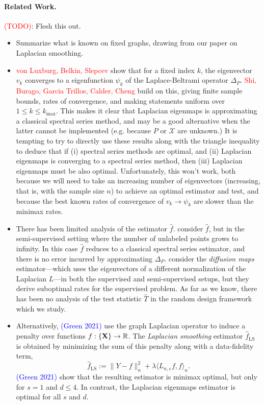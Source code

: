 \documentclass{article}
\newcommand{\Reals}{\mathbb{R}}
\newcommand{\1}{\mathbf{1}}
\newcommand{\mc}[1]{\mathcal{#1}}
\newcommand{\dotp}[2]{\langle #1, #2 \rangle}
\newcommand{\wh}[1]{\widehat{#1}}
\theoremstyle{alden}
\theoremstyle{aldenthm}
\theoremstyle{definition}
\theoremstyle{remark}
\begin{document}
\paragraph{Related Work.}
\textcolor{red}{(TODO)}: Flesh this out.
\begin{itemize}
	\item Summarize what is known on fixed graphs, drawing from our paper on Laplacian smoothing.
	\item \textcolor{red}{von Luxburg, Belkin, Slepcev} show that for a fixed index $k$, the eigenvector $v_k$ converges to a eigenfunction $\psi_k$ of the Laplace-Beltrami operator $\Delta_P$. \textcolor{red}{Shi, Burago, Garcia Trillos, Calder, Cheng} build on this, giving finite sample bounds, rates of convergence, and making statements uniform over $1 \leq k \leq k_{\max}$. This makes it clear that Laplacian eigenmaps is approximating a classical spectral series method, and may be a good alternative when the latter cannot be implemented (e.g. because $P$ or $\mc{X}$ are unknown.) It is tempting to try to directly use these results along with the triangle inequality to deduce that if (i)  spectral series methods are optimal, and (ii) Laplacian eigenmaps is converging to a spectral series method, then (iii) Laplacian eigenmaps must be also optimal. Unfortunately, this won't work, both because we will need to take an increasing number of eigenvectors (increasing, that is, with the sample size $n$) to achieve an optimal estimator and test, and because the best known rates of convergence of $v_k \to \psi_k$ are slower than the minimax rates.
	\item There has been limited analysis of the estimator $\wh{f}$. \cite{zhou2011} consider $\wh{f}$, but in the semi-supervised setting where the number of unlabeled points grows to infinity. In this case $\wh{f}$ reduces to a classical spectral series estimator, and there is no error incurred by approximating $\Delta_P$. \cite{lee2016} consider the \emph{diffusion maps} estimator---which uses the eigenvectors of a different normalization of the Laplacian $L$---in both the supervised and semi-supervised setups, but they derive suboptimal rates for the supervised problem. As far as we know, there has been no analysis of the test statistic $\wh{T}$ in the random design framework which we study.
	\item Alternatively, \cite{trillos2020} \textcolor{blue}{(Green 2021)} use the graph Laplacian operator to induce a penalty over functions $f: \{\bf X\} \to \Reals$. The \emph{Laplacian smoothing} estimator $\wh{f}_{\mathrm{LS}}$ is obtained by minimizing the sum of this penalty along with a data-fidelity term,
	\begin{equation*}
	\wh{f}_{\mathrm{LS}} := \|Y - f\|_n^2 + \lambda \dotp{L_{n,\varepsilon}f}{f}_n.
	\end{equation*}
	\textcolor{blue}{(Green 2021)} show that the resulting estimator is minimax optimal, but only for $s = 1$ and $d \leq 4$. In contrast, the Laplacian eigenmaps estimator is optimal for all $s$ and $d$. 
\end{itemize}
\end{document}
